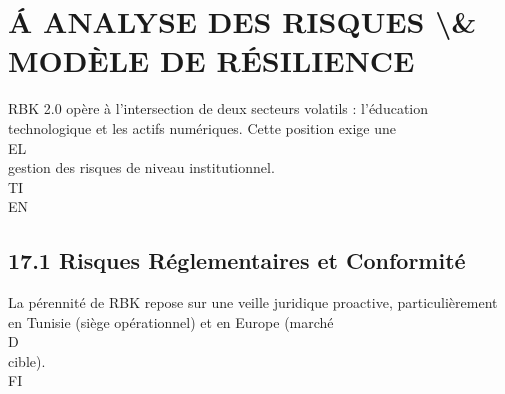 \section{Á ANALYSE DES RISQUES \textbackslash{}& MODÈLE DE RÉSILIENCE}
\vspace{0.5em}
\vspace{0.5em}
RBK 2.0 opère à l’intersection de deux secteurs volatils : l’éducation technologique et les actifs numériques. Cette position exige une\\
\vspace{0.5em}
\vspace{0.5em}
\vspace{0.5em}
\vspace{0.5em}
EL\\
gestion des risques de niveau institutionnel.\\
\vspace{0.5em}
\vspace{0.5em}
\vspace{0.5em}
\vspace{0.5em}
TI\\
EN\\
\subsection{17.1 Risques Réglementaires et Conformité}
La pérennité de RBK repose sur une veille juridique proactive, particulièrement en Tunisie (siège opérationnel) et en Europe (marché\\
\vspace{0.5em}
\vspace{0.5em}
\vspace{0.5em}
\vspace{0.5em}
D\\
cible).\\
\vspace{0.5em}
\vspace{0.5em}
\vspace{0.5em}
\vspace{0.5em}
FI\\
